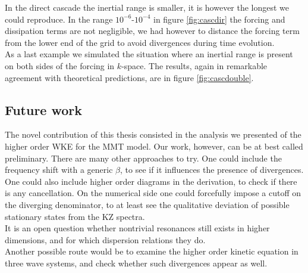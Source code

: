     In the direct cascade the inertial range is smaller, it is however the longest we could reproduce. In the range $10^{-6}$-$10^{-4}$ in figure \ref{fig:cascdir}  the forcing and dissipation terms are not negligible, we had however to distance the forcing term from the lower end of the grid to avoid divergences during time evolution. \\
    As a last example we simulated the situation where an inertial range is present on both sides of the forcing in $k$-space. The results, again in remarkable agreement with theoretical predictions, are in figure \ref{fig:cascdouble}. \\
    \subsection{Future work}

    The novel contribution of this thesis consisted in the analysis we presented of the higher order WKE for the MMT model. 
    Our work, however, can be at best called preliminary. There are many other approaches to try. One could include the frequency shift with a generic $\beta$, to see if it influences the presence of divergences. One could also include higher order diagrams in the derivation, to check if there is any cancellation. On the numerical side one could forcefully impose a cutoff on the diverging denominator, to at least see the qualitative deviation of possible stationary states from the KZ spectra.\\
    It is an open question whether nontrivial resonances still exists in higher dimensions, and for which dispersion relations they do.\\
    Another possible route would be to examine the higher order kinetic equation in three wave systems, and check whether such divergences appear as well. 

    
